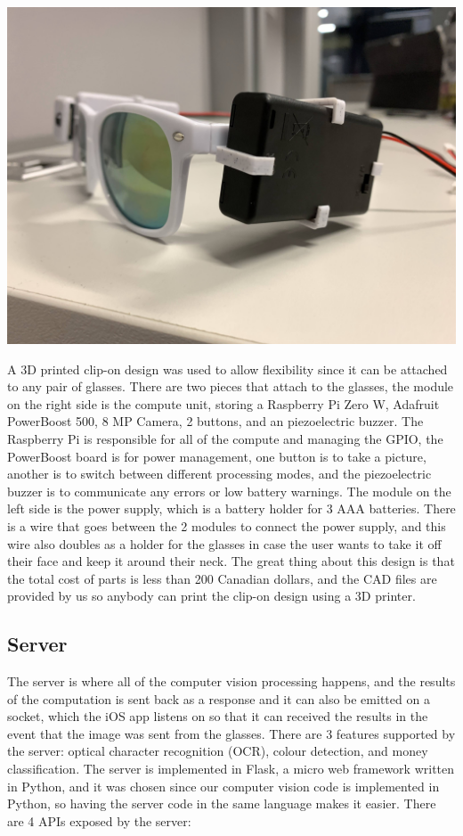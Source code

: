 \documentclass[a4paper,11pt]{article}
\begin{document}
\begin{center}
    \includegraphics[width={0.3\linewidth}]{img/glasses/right.jpg}
\end{center}

A 3D printed clip-on design was used to allow flexibility since it can be attached to any pair of glasses. There are two pieces that attach to the glasses, the module on the right side is the compute unit, storing a Raspberry Pi Zero W, Adafruit PowerBoost 500, 8 MP Camera, 2 buttons, and an piezoelectric buzzer. The Raspberry Pi is responsible for all of the compute and managing the GPIO, the PowerBoost board is for power management, one button is to take a picture, another is to switch between different processing modes, and the piezoelectric buzzer is to communicate any errors or low battery warnings. The module on the left side is the power supply, which is a battery holder for 3 AAA batteries. There is a wire that goes between the 2 modules to connect the power supply, and this wire also doubles as a holder for the glasses in case the user wants to take it off their face and keep it around their neck. The great thing about this design is that the total cost of parts is less than 200 Canadian dollars, and the CAD files are provided by us so anybody can print the clip-on design using a 3D printer.

\subsection{Server}
The server is where all of the computer vision processing happens, and the results of the computation is sent back as a response and it can also be emitted on a socket, which the iOS app listens on so that it can received the results in the event that the image was sent from the glasses. There are 3 features supported by the server: optical character recognition (OCR), colour detection, and money classification. The server is implemented in Flask, a micro web framework written in Python, and it was chosen since our computer vision code is implemented in Python, so having the server code in the same language makes it easier. There are 4 APIs exposed by the server:
\end{document}
